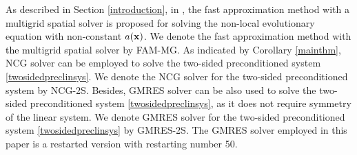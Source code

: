\documentclass[11pt]{article}%
\numberwithin{equation}{section}
\begin{document}
As described in Section \ref{introduction}, in \cite{lin2016fast}, the fast approximation method with \textcolor{black}{a} multigrid spatial solver is proposed for solving the non-local evolutionary equation with non-constant $a({\bf x})$. We denote the fast approximation method with \textcolor{black}{the} multigrid spatial solver by FAM-MG.
As indicated by Corollary \ref{mainthm}, NCG solver can be employed to solve the two-sided preconditioned system \eqref{twosidedpreclinsys}. We denote the NCG solver for the two-sided preconditioned system by NCG-2S. Besides, GMRES solver can be also used to solve the two-sided preconditioned system \eqref{twosidedpreclinsys}, as it does not require symmetry of the linear system. We denote GMRES solver for the two-sided preconditioned system \eqref{twosidedpreclinsys} by GMRES-2S. The GMRES solver employed in this paper is a restarted version with restarting number 50.
\end{document}
